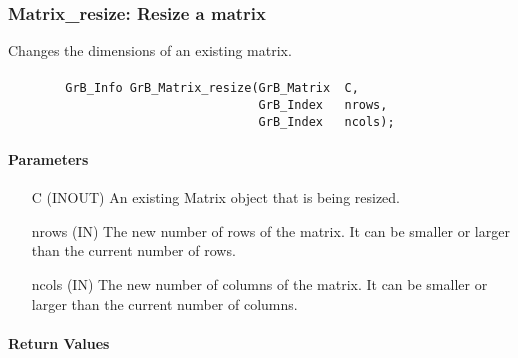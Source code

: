 \subsubsection{{\sf Matrix\_resize}: Resize a matrix}

Changes the dimensions of an existing matrix.

\paragraph{\syntax}

\begin{verbatim}
        GrB_Info GrB_Matrix_resize(GrB_Matrix  C,
                                   GrB_Index   nrows,
                                   GrB_Index   ncols);
\end{verbatim}

\paragraph{Parameters}

\begin{itemize}[leftmargin=1.1in]
    \item[{\sf C}] ({\sf INOUT}) An existing Matrix object that is being resized.
    \item[{\sf nrows}] ({\sf IN}) The new number of rows of the matrix. It can be smaller or larger than the current number of rows.
    \item[{\sf ncols}] ({\sf IN}) The new number of columns of the matrix. It can be smaller or larger than the current number of columns.
\end{itemize}

\paragraph{Return Values}

